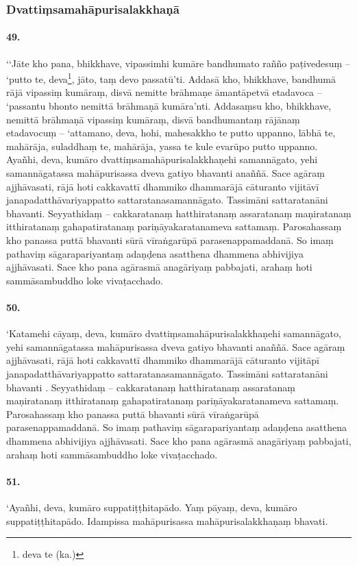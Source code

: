 \subsubsection{Dvattiṃsamahāpurisalakkhaṇā}

\paragraph{49.} ‘‘Jāte kho pana, bhikkhave, vipassimhi kumāre bandhumato rañño paṭivedesuṃ – ‘putto te, deva\footnote{deva te (ka.)}, jāto, taṃ devo passatū’ti. Addasā kho, bhikkhave, bandhumā rājā vipassiṃ kumāraṃ, disvā nemitte brāhmaṇe āmantāpetvā etadavoca – ‘passantu bhonto nemittā brāhmaṇā kumāra’nti. Addasaṃsu kho, bhikkhave, nemittā brāhmaṇā vipassiṃ kumāraṃ, disvā bandhumantaṃ rājānaṃ etadavocuṃ – ‘attamano, deva, hohi, mahesakkho te putto uppanno, lābhā te, mahārāja, suladdhaṃ te, mahārāja, yassa te kule evarūpo putto uppanno. Ayañhi, deva, kumāro dvattiṃsamahāpurisalakkhaṇehi samannāgato, yehi samannāgatassa mahāpurisassa dveva gatiyo bhavanti anaññā. Sace agāraṃ ajjhāvasati, rājā hoti cakkavattī dhammiko dhammarājā cāturanto vijitāvī janapadatthāvariyappatto sattaratanasamannāgato. Tassimāni sattaratanāni bhavanti. Seyyathidaṃ – cakkaratanaṃ hatthiratanaṃ assaratanaṃ maṇiratanaṃ itthiratanaṃ gahapatiratanaṃ pariṇāyakaratanameva sattamaṃ. Parosahassaṃ kho panassa puttā bhavanti sūrā vīraṅgarūpā parasenappamaddanā. So imaṃ pathaviṃ sāgarapariyantaṃ adaṇḍena asatthena dhammena abhivijiya ajjhāvasati. Sace kho pana agārasmā anagāriyaṃ pabbajati, arahaṃ hoti sammāsambuddho loke vivaṭacchado.

\paragraph{50.} ‘Katamehi cāyaṃ, deva, kumāro dvattiṃsamahāpurisalakkhaṇehi samannāgato, yehi samannāgatassa mahāpurisassa dveva gatiyo bhavanti anaññā. Sace agāraṃ ajjhāvasati, rājā hoti cakkavattī dhammiko dhammarājā cāturanto vijitāpī janapadatthāvariyappatto sattaratanasamannāgato. Tassimāni sattaratanāni bhavanti . Seyyathidaṃ – cakkaratanaṃ hatthiratanaṃ assaratanaṃ maṇiratanaṃ itthiratanaṃ gahapatiratanaṃ pariṇāyakaratanameva sattamaṃ. Parosahassaṃ kho panassa puttā bhavanti sūrā vīraṅgarūpā parasenappamaddanā. So imaṃ pathaviṃ sāgarapariyantaṃ adaṇḍena asatthena dhammena abhivijiya ajjhāvasati. Sace kho pana agārasmā anagāriyaṃ pabbajati, arahaṃ hoti sammāsambuddho loke vivaṭacchado.

\paragraph{51.} ‘Ayañhi, deva, kumāro suppatiṭṭhitapādo. Yaṃ pāyaṃ, deva, kumāro suppatiṭṭhitapādo. Idampissa mahāpurisassa mahāpurisalakkhaṇaṃ bhavati.

